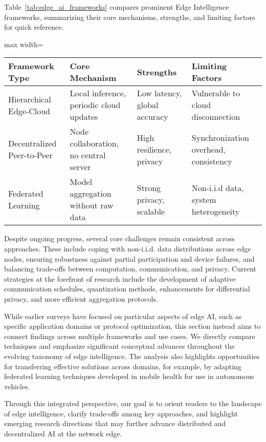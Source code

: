 \documentclass[sigconf]{acmart}
\begin{document}
Table~\ref{tab:edge_ai_frameworks} compares prominent Edge Intelligence frameworks, summarizing their core mechanisms, strengths, and limiting factors for quick reference.

\begin{table*}[htbp]
\centering
\caption{Comparative Summary of Edge Intelligence Frameworks}
\label{tab:edge_ai_frameworks}
\begin{adjustbox}{max width=\textwidth}
\begin{tabular}{@{}llll@{}}
\toprule
Framework Type & Core Mechanism & Strengths & Limiting Factors \\
\midrule
Hierarchical Edge-Cloud & Local inference, periodic cloud updates & Low latency, global accuracy & Vulnerable to cloud disconnection \\
Decentralized Peer-to-Peer & Node collaboration, no central server & High resilience, privacy & Synchronization overhead, consistency \\
Federated Learning & Model aggregation without raw data & Strong privacy, scalable & Non-i.i.d data, system heterogeneity \\
\bottomrule
\end{tabular}
\end{adjustbox}
\end{table*}

Despite ongoing progress, several core challenges remain consistent across approaches. These include coping with non-i.i.d. data distributions across edge nodes, ensuring robustness against partial participation and device failures, and balancing trade-offs between computation, communication, and privacy. Current strategies at the forefront of research include the development of adaptive communication schedules, quantization methods, enhancements for differential privacy, and more efficient aggregation protocols.

While earlier surveys have focused on particular aspects of edge AI, such as specific application domains or protocol optimization, this section instead aims to connect findings across multiple frameworks and use cases. We directly compare techniques and emphasize significant conceptual advances throughout the evolving taxonomy of edge intelligence. The analysis also highlights opportunities for transferring effective solutions across domains, for example, by adapting federated learning techniques developed in mobile health for use in autonomous vehicles.

Through this integrated perspective, our goal is to orient readers to the landscape of edge intelligence, clarify trade-offs among key approaches, and highlight emerging research directions that may further advance distributed and decentralized AI at the network edge.
\end{document}
